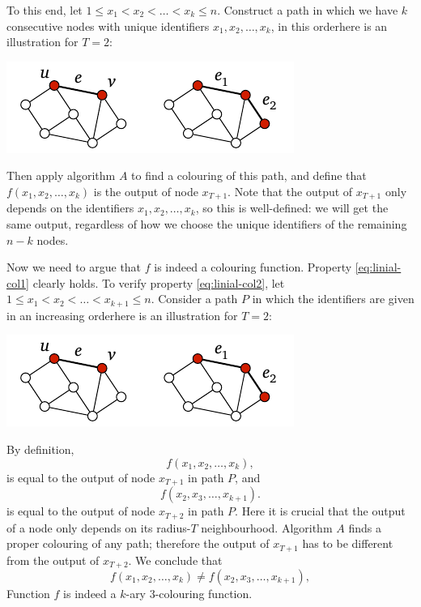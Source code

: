 To this end, let $1 \le x_1 < x_2 < \dotso < x_k \le n$. Construct a path in which we have $k$ consecutive nodes with unique identifiers $x_1, x_2, \dotsc, x_k$, in this order\mydash here is an illustration for $T = 2$:
\begin{center}
    \includegraphics[page=\PIntroIdIncr]{figs.pdf}
\end{center}
Then apply algorithm $A$ to find a colouring of this path, and define that $f(x_1, x_2, \dotsc, x_k)$ is the output of node $x_{T+1}$. Note that the output of $x_{T+1}$ only depends on the identifiers $x_1, x_2, \dotsc,\allowbreak x_k$, so this is well-defined: we will get the same output, regardless of how we choose the unique identifiers of the remaining $n-k$ nodes.

Now we need to argue that $f$ is indeed a colouring function. Property \eqref{eq:linial-col1} clearly holds. To verify property \eqref{eq:linial-col2}, let $1 \le x_1 < x_2 < \dotso < x_{k+1} \le n$. Consider a path $P$ in which the identifiers are given in an increasing order\mydash here is an illustration for $T = 2$:
\begin{center}
    \includegraphics[page=\PIntroIdIncrB]{figs.pdf}
\end{center}
By definition,
\[
    f(x_1, x_2, \dotsc, x_k),
\]
is equal to the output of node $x_{T+1}$ in path $P$, and
\[
    f(x_2, x_3, \dotsc, x_{k+1}).
\]
is equal to the output of node $x_{T+2}$ in path $P$. Here it is crucial that the output of a node only depends on its radius-$T$ neighbourhood. Algorithm $A$ finds a proper colouring of any path; therefore the output of $x_{T+1}$ has to be different from the output of $x_{T+2}$. We conclude that
\[
    f(x_1, x_2, \dotsc, x_k) \ne f(x_2, x_3, \dotsc, x_{k+1}),
\]
Function $f$ is indeed a $k$-ary $3$-colouring function.

